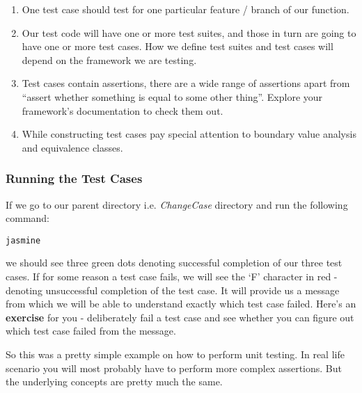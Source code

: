 \documentclass{article}
\begin{document}
\begin{enumerate}
	\item One test case should test for one particular feature / branch of our function.
	\item Our test code will have one or more test suites, and those in turn are going to have one or more test cases.
		How we define test suites and test cases will depend on the framework we are testing.
	\item Test cases contain assertions, there are a wide range of assertions apart from 
		``assert whether something is equal to some other thing''. Explore your framework's documentation to check them out.
	\item While constructing test cases pay special attention to boundary value analysis and equivalence classes.
\end{enumerate}

\subsubsection{Running the Test Cases}
If we go to our parent directory i.e. \textit{ChangeCase} directory and run the following command:
\begin{verbatim}
jasmine
\end{verbatim}
we should see three green dots denoting successful completion of our three test cases.
If for some reason a test case fails, we will see the `F' character in red - denoting unsuccessful completion of the test case.
It will provide us a message from which we will be able to understand exactly which test case failed.
Here's an \textbf{exercise} for you - 
deliberately fail a test case and see whether you can figure out which test case failed from the message.

So this was a pretty simple example on how to perform unit testing. In real life scenario you will most probably have to perform more
complex assertions. But the underlying concepts are pretty much the same.
\end{document}

